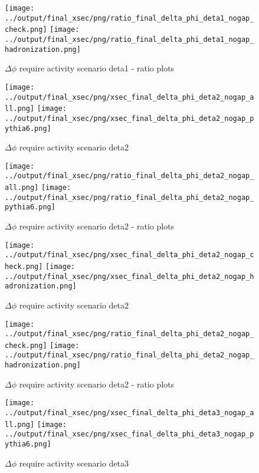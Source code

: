 \documentclass[11pt]{article}
\begin{document}
\begin{figure}[ht]
\centering
\texttt{[image: ../output/final\_xsec/png/ratio\_final\_delta\_phi\_deta1\_nogap\_check.png]}
\texttt{[image: ../output/final\_xsec/png/ratio\_final\_delta\_phi\_deta1\_nogap\_hadronization.png]}
\caption{$\Delta\phi$ require activity scenario deta1 - ratio plots}
\label{fig:delta_phi_deta1_nogapb_ratio}
\end{figure}

\begin{figure}[ht]
\centering
\texttt{[image: ../output/final\_xsec/png/xsec\_final\_delta\_phi\_deta2\_nogap\_all.png]}
\texttt{[image: ../output/final\_xsec/png/xsec\_final\_delta\_phi\_deta2\_nogap\_pythia6.png]}
\caption{$\Delta\phi$ require activity scenario deta2}
\label{fig:delta_phi_deta2_nogap}
\end{figure}

\begin{figure}[ht]
\centering
\texttt{[image: ../output/final\_xsec/png/ratio\_final\_delta\_phi\_deta2\_nogap\_all.png]}
\texttt{[image: ../output/final\_xsec/png/ratio\_final\_delta\_phi\_deta2\_nogap\_pythia6.png]}
\caption{$\Delta\phi$ require activity scenario deta2 - ratio plots}
\label{fig:delta_phi_deta2_nogap_ratio}
\end{figure}

\begin{figure}[ht]
\centering
\texttt{[image: ../output/final\_xsec/png/xsec\_final\_delta\_phi\_deta2\_nogap\_check.png]}
\texttt{[image: ../output/final\_xsec/png/xsec\_final\_delta\_phi\_deta2\_nogap\_hadronization.png]}
\caption{$\Delta\phi$ require activity scenario deta2}
\label{fig:delta_phi_deta2_nogapb}
\end{figure}

\begin{figure}[ht]
\centering
\texttt{[image: ../output/final\_xsec/png/ratio\_final\_delta\_phi\_deta2\_nogap\_check.png]}
\texttt{[image: ../output/final\_xsec/png/ratio\_final\_delta\_phi\_deta2\_nogap\_hadronization.png]}
\caption{$\Delta\phi$ require activity scenario deta2 - ratio plots}
\label{fig:delta_phi_deta2_nogapb_ratio}
\end{figure}

\begin{figure}[ht]
\centering
\texttt{[image: ../output/final\_xsec/png/xsec\_final\_delta\_phi\_deta3\_nogap\_all.png]}
\texttt{[image: ../output/final\_xsec/png/xsec\_final\_delta\_phi\_deta3\_nogap\_pythia6.png]}
\caption{$\Delta\phi$ require activity scenario deta3}
\label{fig:delta_phi_deta3_nogap}
\end{figure}
\end{document}
